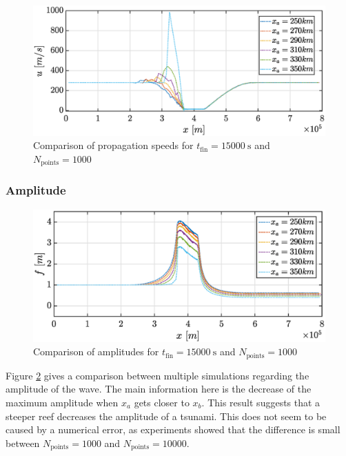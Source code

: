 \documentclass[a4paper,12pt,twoside]{article}
\begin{document}
        \begin{figure}[h]
          \centering
          \includegraphics[width=\textwidth]{graphs/xa_u.eps}
          \caption{Comparison of propagation speeds for $t_\text{fin} = \SI{15000}{\s}$ and $N_\text{points} = \num{1000}$}
          \label{fig:xa-u}
        \end{figure}


      \subsubsection{Amplitude}
        \begin{figure}[h]
          \centering
          \includegraphics[width=\textwidth]{graphs/xa_f.eps}
          \caption{Comparison of amplitudes for $t_\text{fin} = \SI{15000}{\s}$ and $N_\text{points} = \num{1000}$}
          \label{fig:xa-f}
        \end{figure}

        Figure \ref{fig:xa-f} gives a comparison between multiple simulations regarding the amplitude of the wave.
        The main information here is the decrease of the maximum amplitude when $x_a$ gets closer to $x_b$.
        This result suggests that a steeper reef decreases the amplitude of a tsunami.
        This does not seem to be caused by a numerical error, as experiments showed that the difference is small between $N_\text{points}=\num{1000}$ and $N_\text{points}=\num{10000}$. %
\end{document}
